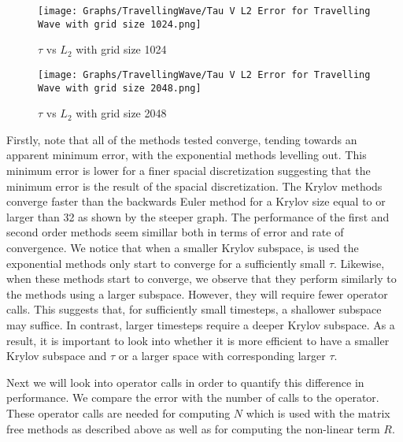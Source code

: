 \begin{figure}[H]
    \centering
    \begin{minipage}{0.49\textwidth}
        \texttt{[image: Graphs/TravellingWave/Tau V L2 Error for Travelling Wave with grid size 1024.png]} %
        \caption{$\tau$ vs $L_2$ with grid size 1024}
        \label{fig:plot1}
    \end{minipage}\hfill
    \centering
    \begin{minipage}{0.49\textwidth}
        \texttt{[image: Graphs/TravellingWave/Tau V L2 Error for Travelling Wave with grid size 2048.png]} %
        \caption{$\tau$ vs $L_2$ with grid size 2048}
        \label{fig:plot2}
    \end{minipage}\hfill
\end{figure}

Firstly, note that all of the methods tested converge, tending towards an apparent minimum error, with the exponential methods levelling out.
This minimum error is lower for a finer spacial discretization suggesting that the minimum error is the result of the spacial discretization.
The Krylov methods converge faster than the backwards Euler method for a Krylov size equal to or larger than 32 as shown by the steeper graph.
The performance of the first and second order methods seem simillar both in terms of error and rate of convergence.
We notice that when a smaller Krylov subspace, is used the exponential methods only start to converge for a sufficiently small $\tau$.
Likewise, when these methods start to converge, we observe that they perform similarly to the methods using a larger subspace.
However, they will require fewer operator calls.
This suggests that, for sufficiently small timesteps, a shallower subspace may suffice.
In contrast, larger timesteps require a deeper Krylov subspace.
As a result, it is important to look into whether it is more efficient to have a smaller Krylov subspace and $\tau$ or a larger space with corresponding larger $\tau$.

Next we will look into operator calls in order to quantify this difference in performance.
We compare the error with the number of calls to the operator.
These operator calls are needed for computing $N$ which is used with the matrix free methods as described above as well as for computing the non-linear term $R$.

